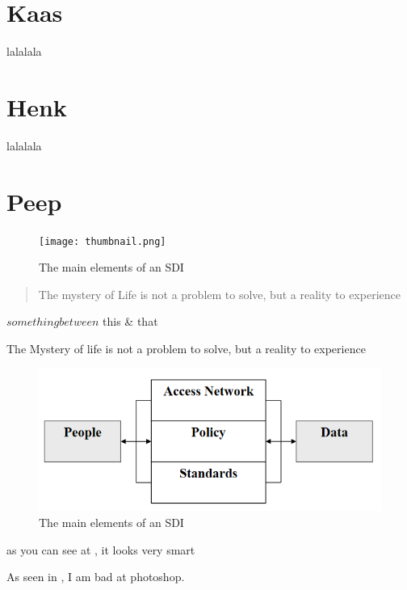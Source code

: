 \section{Kaas}
lalalala 


\section{Henk}
lalalala 


\section{Peep}
\begin{figure}
    \centering
    \graphicspath{ {images/} }
    \texttt{[image: thumbnail.png]}
    \caption{The main elements of an SDI}
    \label{fig:thumbnail}
\end{figure}

\begin{quote}
    The mystery of Life is not a problem to solve, but a reality to experience \cite{einstein}
\end{quote}



\(something between\) this \& that 

The Mystery of life is not a problem to solve, but a reality to experience
\cite{einstein}

\begin{figure}
    \centering
    \includegraphics[width=12cm]{images/test.png}
    \caption{The main elements of an SDI}
    \label{fig:thingie} %
\end{figure}

as you can see at , it looks very smart


As seen in , I am bad at photoshop.
